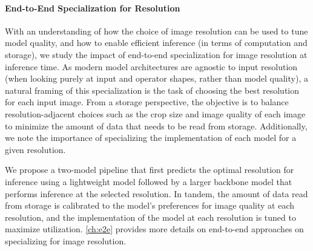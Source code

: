 \paragraph{End-to-End Specialization for Resolution}
With an understanding of how the choice of image resolution can be used to tune model quality, and how to enable efficient inference (in terms of computation and storage), we study the impact of end-to-end specialization for image resolution at inference time.
As modern model architectures are agnostic to input resolution (when looking purely at input and operator shapes, rather than model quality), a natural framing of this specialization is the task of choosing the best resolution for each input image.
From a storage perspective, the objective is to balance resolution-adjacent choices such as the crop size and image quality of each image to minimize the amount of data that needs to be read from storage.
Additionally, we note the importance of specializing the implementation of each model for a given resolution.

We propose a two-model pipeline that first predicts the optimal resolution for inference using a lightweight model followed by a larger backbone model that performs inference at the selected resolution.
In tandem, the amount of data read from storage is calibrated to the model's preferences for image quality at each resolution, and the implementation of the model at each resolution is tuned to maximize utilization.
\autoref{ch:e2e} provides more details on end-to-end approaches on specializing for image resolution.

